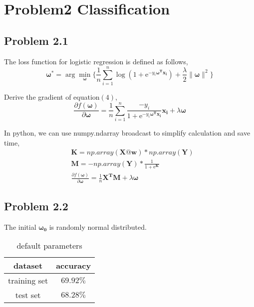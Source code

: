 \documentclass[a4paper,11pt]{article}
\begin{document}
\section{Problem2 Classification}
\subsection*{Problem 2.1}
The loss function for logistic regression is defined as follows,\\
\begin{equation}
\bm{\omega^{*}}=\arg\min_{\bm{\omega}}\{
\frac{1}{n}\sum_{i=1}^{n}{\log(1+\mathrm{e}^{-y_{i}\bm{\omega^{T}}\bm{x_{i}}})}+\frac{\lambda}{2}\|\bm{\omega}\|^{2}\}
\end{equation}
\par
Derive the gradient of equation$(4)$,\\
\begin{equation}
\frac{\partial f(\bm{\omega})}{\partial\bm{\omega}}=\frac{1}{n} \sum_{i=1}^{n}\frac{-y_{i}}{1+\mathrm{e}^{-y_{i}\bm{\omega^{T}}\bm{x_{i}}}}\bm{x_{i}}+\lambda\bm{\omega}
\end{equation}
\par
In python, we can use numpy.ndarray broadcast to simplify calculation and save time,\\
\begin{equation}
\begin{aligned}
&\bm{K}=np.array(\bm{X}@\bm{w})*np.array(\bm{Y})\\
&\bm{M}=-np.array(\bm{Y})*\frac{1}{1+\mathrm{e}^{\bm{K}}}\\
&\frac{\partial f(\bm{\omega})}{\partial\bm{\omega}}=\frac{1}{n}\bm{X^{T}}\bm{M} +\lambda\bm{\omega}
\end{aligned}
\end{equation}
\par
\subsection*{Problem 2.2}
The initial $\bm{\omega_{0}}$ is randomly normal distributed.\\
\begin{table}[H]
	\begin{center}
		\caption{default parameters}
		\begin{tabular}{cc}
			\toprule[2pt]
			dataset & accuracy\\
			\hline
			training set&$69.92\%$\\
			test set&$68.28\%$\\
			\bottomrule[2pt]
		\end{tabular} 
	\end{center}
\end{table}
\end{document}
